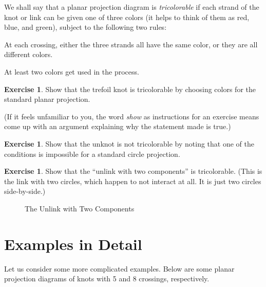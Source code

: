 \documentclass[12pt,letterpaper]{article}
\theoremstyle{definition}
\newtheorem{exercise}[question]{Exercise}
\begin{document}
We shall say that a planar projection diagram is \emph{tricolorable} if each strand of the knot or link can be given one of three colors (it helps to think of them as red, blue, and green), subject to the following two rules:
\begin{compactitem}
\item At each crossing, either the three strands all have the same color, or they are all different colors.
\item At least two colors get used in the process.
\end{compactitem}

\begin{exercise}
Show that the trefoil knot is tricolorable by choosing colors for the standard planar projection.
\end{exercise}

(If it feels unfamiliar to you, the word \emph{show} as instructions for an exercise means come up with an argument explaining why the statement made is true.)

\begin{exercise}
Show that the unknot is not tricolorable by noting that one of the conditions is impossible for a standard circle projection.
\end{exercise}

\begin{exercise}
Show that the ``unlink with two components'' is tricolorable.
(This is the link with two circles, which happen to not interact at all.
It is just two circles side-by-side.)
\end{exercise}

\begin{figure}[h]
    \centering
    \caption{The Unlink with Two Components}
\end{figure}

\section*{Examples in Detail}
Let us consider some more complicated examples. 
Below are some planar projection diagrams of knots with 5 and 8 crossings, respectively.
\end{document}
